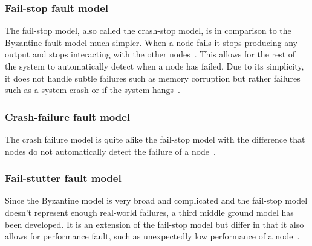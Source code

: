 \documentclass{cslthse-msc}
\begin{document}
\subsubsection{Fail-stop fault model} \label{subsub:background_fail_stop}
The fail-stop model, also called the crash-stop model, is in comparison to the Byzantine fault model much simpler. When a node fails it stops producing any output and stops interacting with the other nodes~\cite{faultTolerantFundamentals}. This allows for the rest of the system to automatically detect when a node has failed. Due to its simplicity, it does not handle subtle failures such as memory corruption but rather failures such as a system crash or if the system hangs~\cite{surveyFaultParallel}. %


\subsubsection{Crash-failure fault model}
The crash failure model is quite alike the fail-stop model with the difference that nodes do not automatically detect the failure of a node~\cite{faultTolerantFundamentals, adaptiveAgentReplication}.

\subsubsection{Fail-stutter fault model}
Since the Byzantine model is very broad and complicated and the fail-stop model doesn't represent enough real-world failures, a third middle ground model has been developed. It is an extension of the fail-stop model but differ in that it also allows for performance fault, such as unexpectedly low performance of a node~\cite{surveyFaultParallel}.
\end{document}
